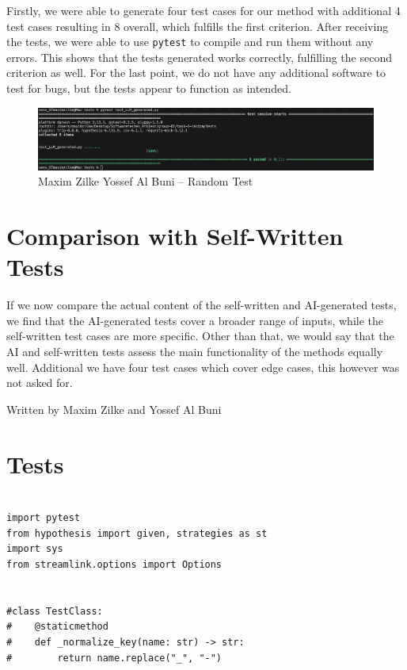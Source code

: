 \documentclass[a4paper]{scrreprt}
\begin{document}
\begin{aiTask}
\begin{answer}
Firstly, we were able to generate four test cases for our method with additional 4 test cases resulting in 8 overall, which fulfills the first criterion. After receiving the tests, we were able to use \texttt{pytest} to compile and run them without any errors. This shows that the tests generated works correctly, fulfilling the second criterion as well. For the last point, we do not have any additional software to test for bugs, but the tests appear to function as intended.

\begin{figure}[h]
    \centering
    \includegraphics[width=1\textwidth]{LLM_Task_1.png} 
    \caption{Maxim Zilke Yossef Al Buni – Random Test}
    \label{fig:maxim-random-test}
\end{figure}

\section*{Comparison with Self-Written Tests}

If we now compare the actual content of the self-written and AI-generated tests, we find that the AI-generated tests cover a broader range of inputs, while the self-written test cases are more specific. Other than that, we would say that the AI and self-written tests assess the main functionality of the methods equally well. Additional we have four test cases which cover edge cases, this however was not asked for.


Written by Maxim Zilke and Yossef Al Buni
\section*{Tests}


\begin{lstlisting}[caption={Hypothesis-Test für \_normalize\_key by Maxim Zilke and Yossef Al Buni}, label={lst:normalize-key}]

import pytest
from hypothesis import given, strategies as st
import sys
from streamlink.options import Options


#class TestClass:
#    @staticmethod
#    def _normalize_key(name: str) -> str:
#        return name.replace("_", "-")



\end{lstlisting}
\end{answer}
\end{aiTask}
\end{document}
